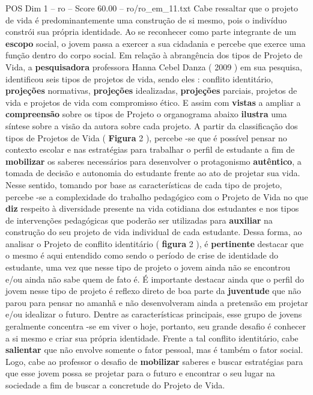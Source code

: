 \begin{textsample}{POS Dim 1 – ro – Score 60.00 – ro/ro\_em\_11.txt}
Cabe ressaltar que o projeto de vida é predominantemente uma construção de si mesmo, pois o indivíduo constrói sua própria identidade.
Ao se reconhecer como parte integrante de um \textbf{escopo} social, o jovem passa a exercer a sua cidadania e percebe que exerce uma função dentro do corpo social.
Em relação à abrangência dos tipos de Projeto de Vida, a \textbf{pesquisadora} professora Hanna Cebel Danza ( 2009 ) em sua pesquisa, identificou seis tipos de projetos de vida, sendo eles : conflito identitário, \textbf{projeções} normativas, \textbf{projeções} idealizadas, \textbf{projeções} parciais, projetos de vida e projetos de vida com compromisso ético.
E assim com \textbf{vistas} a ampliar a \textbf{compreensão} sobre os tipos de Projeto o organograma abaixo \textbf{ilustra} uma síntese sobre a visão da autora sobre cada projeto.
A partir da classificação dos tipos de Projetos de Vida ( \textbf{Figura} 2 ), percebe -se que é possível pensar no contexto escolar e nas estratégias para trabalhar o perfil de estudante a fim de \textbf{mobilizar} os saberes necessários para desenvolver o protagonismo \textbf{autêntico}, a tomada de decisão e autonomia do estudante frente ao ato de projetar sua vida.
Nesse sentido, tomando por base as características de cada tipo de projeto, percebe -se a complexidade do trabalho pedagógico com o Projeto de Vida no que \textbf{diz} respeito à diversidade presente na vida cotidiana dos estudantes e nos tipos de intervenções pedagógicas que poderão ser utilizadas para \textbf{auxiliar} na construção do seu projeto de vida individual de cada estudante.
Dessa forma, ao analisar o Projeto de conflito identitário ( \textbf{figura} 2 ), é \textbf{pertinente} destacar que o mesmo é aqui entendido como sendo o período de crise de identidade do estudante, uma vez que nesse tipo de projeto o jovem ainda não se encontrou e/ou ainda não sabe quem de fato é.
É importante destacar ainda que o perfil do jovem nesse tipo de projeto é reflexo direto de boa parte da \textbf{juventude} que não parou para pensar no amanhã e não desenvolveram ainda a pretensão em projetar e/ou idealizar o futuro.
Dentre as características principais, esse grupo de jovens geralmente concentra -se em viver o hoje, portanto, seu grande desafio é conhecer a si mesmo e criar sua própria identidade.
Frente a tal conflito identitário, cabe \textbf{salientar} que não envolve somente o fator pessoal, mas é também o fator social.
Logo, cabe ao professor o desafio de \textbf{mobilizar} saberes e buscar estratégias para que esse jovem possa se projetar para o futuro e encontrar o seu lugar na sociedade a fim de buscar a concretude do Projeto de Vida.

\end{textsample}
